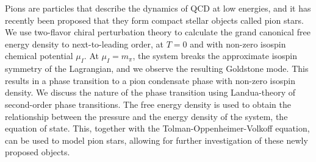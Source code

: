 Pions are particles that describe the dynamics of QCD at low energies, and it has recently been proposed that they form compact stellar objects called pion stars.
We use two-flavor chiral perturbation theory to calculate the grand canonical free energy density to next-to-leading order, at $T = 0$ and with non-zero isospin chemical potential $\mu_I$.
At $\mu_I = m_\pi$, the system breaks the approximate isospin symmetry of the Lagrangian, and we observe the resulting Goldstone mode.
This results in a phase transition to a pion condensate phase with non-zero isospin density.
We discuss the nature of the phase transition using Landua-theory of second-order phase transitions.
The free energy density is used to obtain the relationship between the pressure and the energy density of the system, the equation of state.
This, together with the Tolman-Oppenheimer-Volkoff equation, can be used to model pion stars, allowing for further investigation of these newly proposed objects.

